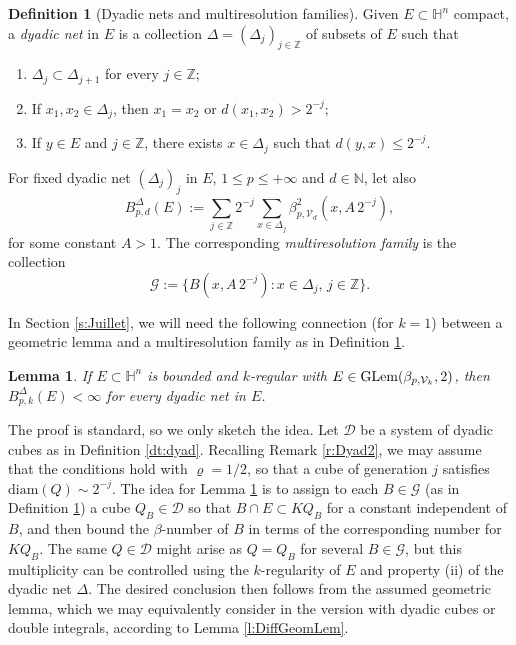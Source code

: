 \documentclass[12pt]{amsart}
\renewcommand{\H}{\mathbb H}
\numberwithin{equation}{section}
\theoremstyle{plain}
\newtheorem{lemma}[theorem]{Lemma}
\theoremstyle{definition}
\newtheorem{definition}[theorem]{Definition}
\theoremstyle{remark}
\begin{document}
\begin{definition}[Dyadic nets and multiresolution families]\cite{schul,Juillet}\label{d:multiRes}
    Given $E\subset \H^n$ compact, a \textit{dyadic net} in $E$ is a collection $\Delta=(\Delta_j)_{j\in\mathbb Z}$ of subsets of $E$ such that
    \begin{enumerate}
        \item[(i)] $\Delta_{j}\subset \Delta_{j+1}$ for every $j\in\mathbb Z$;
        \item[(ii)] If $x_1,x_2\in \Delta_j$, then $x_1=x_2$ or $d(x_1,x_2)>2^{-j};$
        \item[(iii)] If $y\in E$ and $j\in\mathbb Z$, there exists $x\in \Delta_j$ such that $d(y,x)\leq 2^{-j}$.
    \end{enumerate}
    For fixed dyadic net $(\Delta_j)_j$ in $E$, $1\leq p\leq +\infty$ and $d\in\mathbb N$, let also
    \begin{equation}\label{eq:BDef}
    B^\Delta_{p,d}(E):=\sum_{j\in\mathbb Z}2^{-j}\sum_{x\in\Delta_j}\beta^2_{p,\mathcal V_d}(x, A\,2^{-j}),\end{equation}
    for some constant $A>1$.
    The corresponding \textit{multiresolution family} is the collection
    \[ \mathcal G:=\{B(x, A\,2^{-j}): x\in\Delta_j, \,j\in\mathbb Z\}.\]
\end{definition}
In Section \ref{s:Juillet}, we will need the following connection (for $k=1$) between a geometric lemma and a multiresolution family as in Definition \ref{d:multiRes}. 
\begin{lemma}\label{Glemvsmultires}
If $E\subset\mathbb{H}^n$ is bounded and $k$-regular with  $E\in{\rm GLem}(\beta_{p,\mathcal V_k},2)$, then $B_{p,k}^\Delta(E)<\infty$ for every dyadic net in $E$.   
\end{lemma}
The proof is standard, so we only sketch the idea. Let $\mathcal{D}$ be a system of dyadic cubes as in Definition \ref{dt:dyad}. Recalling Remark \ref{r:Dyad2}, we may assume that the conditions hold with $\varrho=1/2$, so that a cube of generation $j$ satisfies $\mathrm{diam}(Q)\sim 2^{-j}$.
The idea for Lemma \ref{Glemvsmultires} is to assign to each $B\in \mathcal{G}$ (as in Definition \ref{d:multiRes}) a cube $Q_B \in \mathcal{D}$ so that $B\cap E \subset K Q_B$ for a constant independent of $B$, and then bound the $\beta$-number of $B$ in terms of the corresponding number for $K Q_B$. The same $Q\in \mathcal{D}$ might arise as $Q=Q_B$ for several $B\in \mathcal{G}$, but this multiplicity can be controlled using the $k$-regularity of $E$ and property (ii) of the dyadic net $\Delta$. The desired conclusion then follows from the assumed geometric lemma, which we may equivalently consider in the version with dyadic cubes or double integrals, according to Lemma \ref{l:DiffGeomLem}.
\end{document}
